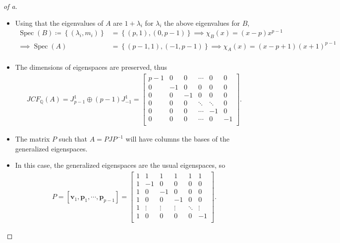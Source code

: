 \begin{solution}
\begin{proof}[of a]
\begin{itemize}
\item
  Using that the eigenvalues of \(A\) are \(1+\lambda_i\) for
  \(\lambda_i\) the above eigenvalues for \(B\),
  \begin{align*}
  \operatorname{Spec}(B) \coloneqq\left\{{(\lambda_i, m_i)}\right\} &=  \left\{{(p, 1), (0, p-1)}\right\}  \implies \chi_{B}(x) = (x-p)x^{p-1} \\ 
  \implies \operatorname{Spec}(A) &= \left\{{(p-1,1), (-1, p-1) }\right\}  \implies \chi_{A}(x) = (x- p+1)(x+1)^{p-1} \\
  \end{align*}
\item
  The dimensions of eigenspaces are preserved, thus
  \begin{align*}
  JCF_{\mathbb{Q}}(A)
  =  J_{p-1}^{1} \oplus (p-1)J_{-1}^1
  =
  \left[\begin{array}{r|r|r|r|r|r}
  p-1 & 0 & 0 & \cdots & 0 & 0 \\
  \hline
  0& -1 & 0 & 0 & 0 & 0 \\ \hline
  0& 0 & -1 & 0 & 0 & 0 \\ \hline
  0& 0 & 0 & \ddots & \ddots & 0 \\ \hline
  0& 0 & 0 & \cdots & -1 & 0 \\ \hline
  0& 0 & 0 & \cdots & 0 & -1 \\
  \end{array}\right]
  .\end{align*}
\item
  The matrix \(P\) such that \(A = PJP^{-1}\) will have columns the
  bases of the generalized eigenspaces.
\item
  In this case, the generalized eigenspaces are the usual eigenspaces,
  so
  \begin{align*}
  P = [\mathbf{v}_1, \mathbf{p}_1, \cdots, \mathbf{p}_{p-1}] =
  \left[\begin{array}{rrrrrr}
  1 & 1 & 1 & 1 & 1 & 1  \\
  1 & -1 & 0 & 0 & 0 & 0 \\
  1 & 0 & -1 & 0 & 0 & 0 \\
  1 & 0 & 0 & -1 & 0 & 0 \\
  1 & \vdots & \vdots & \vdots & \ddots & \vdots\\
  1 & 0 & 0 & 0 & 0 & -1 \\
  \end{array}\right]
  .\end{align*}
\end{itemize}


\end{proof}
\end{solution}
